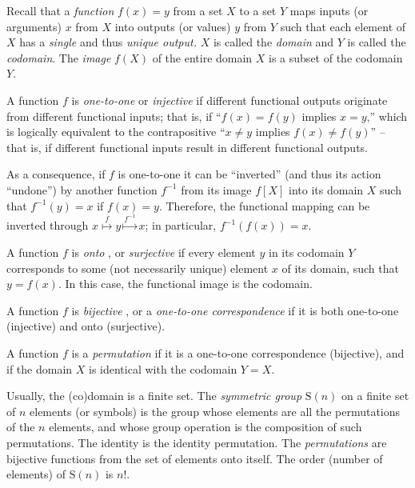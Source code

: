 Recall that a {\em function} $f(x)=y$
from a set $X$ to a set $Y$ maps inputs (or arguments)
$x$ from $X$ into outputs (or values)
$y$ from $Y$ such that each element of $X$ has a {\em single} and thus {\em  unique output.}
$X$ is called the
{\em domain}
and $Y$ is called the
{\em codomain}.
The
{\em image}
$f(X)$ of the entire domain $X$  is a subset of the codomain $Y$.


A function $f$ is
{\em one-to-one}
or
{\em  injective}
if different functional outputs originate from different functional inputs; that is,
if ``$f(x)=f(y)$ implies $x=y$,''
which is logically equivalent to the contrapositive
``$x\neq y$ implies $f(x)\neq f(y)$''
 -- that is, if different functional inputs result in different functional outputs.

As a consequence, if $f$ is one-to-one it can be ``inverted'' (and thus its action ``undone'') by another function $f^{-1}$
from its image $f[X]$ into its domain $X$ such that
$f^{-1}(y)=x$ if $f(x)=y$. Therefore, the functional mapping can be inverted through
$
x
\stackrel{f}{\mapsto}
y
\stackrel{f^{-1}}{\mapsto}
x
$;
in particular,  $f^{-1}(f(x))=x$.

A function $f$ is
{\em onto}
,
or
{\em surjective}
if every element $y$ in its codomain $Y$ corresponds to some (not necessarily unique) element $x$ of its domain, such that $y=f(x)$.
In this case, the functional image is the codomain.


A function $f$ is
{\em bijective}
,
or a
{\em one-to-one correspondence}
if it is both one-to-one (injective) and onto (surjective).

A function $f$ is
a {\em permutation}
if it is a one-to-one correspondence (bijective), and if the domain $X$ is identical with the codomain $Y=X$.

Usually, the (co)domain is a finite set.
The {\em symmetric group}
$\textrm{S}(n)$ on a finite set of $n$ elements (or symbols)
is the group whose elements are all the permutations of the $n$ elements,
and whose group operation is the composition of such permutations.
The identity is the identity permutation.
The {\em permutations} are bijective functions from the set of elements onto itself.
The order (number of elements) of $\textrm{S}(n)$ is $n!$.

